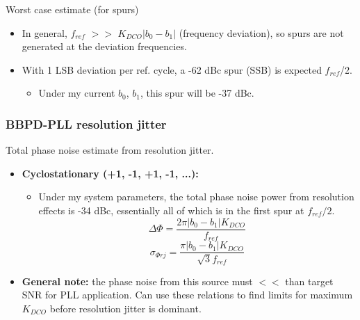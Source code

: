 \documentclass[t, screen, aspectratio=43]{beamer}
\begin{document}
\begin{frame}
\begin{block}{Worst case estimate (for spurs)}
\begin{itemize}[itemsep=4pt,label=\protect---]
			\item In general, $f_{ref}$ $>>$ $K_{DCO}|b_0-b_1|$ (frequency deviation), so spurs are not generated at the deviation frequencies.
			\item With 1 LSB deviation per ref. cycle, a -62 dBc spur (SSB) is expected $f_{ref}$/2.
			\begin{itemize}[itemsep=4pt,label=\protect$\bullet$]
			\item Under my current $b_0$, $b_1$, this spur will be -37 dBc.
		\end{itemize}
		\end{itemize}
		\tiny
	\end{block}	
\end{frame}


\begin{frame}
	\frametitle{BBPD-PLL resolution jitter}
	\begin{block}{Total phase noise estimate from resolution jitter.}
			\tiny

			\begin{itemize}[itemsep=4pt,label=\protect---]
				\item \textbf{Cyclostationary (+1, -1, +1, -1, ...):}
				\begin{itemize}[itemsep=4pt,label=\protect$\bullet$]
					\item Under my system parameters, the total phase noise power from resolution effects is -34 dBc, essentially all of which is in the first spur at $f_{ref}/2$.
					\begin{equation}
						\Delta \Phi  = \frac{2\pi|b_0-b_1|K_{DCO}}{f_{ref}}
					\end{equation}
					\begin{equation}
						\sigma_{\Phi rj}  = \frac{\pi|b_0-b_1|K_{DCO}}{\sqrt{3}f_{ref}}
					\end{equation}
				\end{itemize}
			\item \textbf{General note:} the phase noise from this source must $<<$ than target SNR for PLL application. Can use these relations to find limits for maximum $K_{DCO}$ before resolution jitter is dominant.			\end{itemize}


	\end{block}	
\end{frame}
\end{document}
